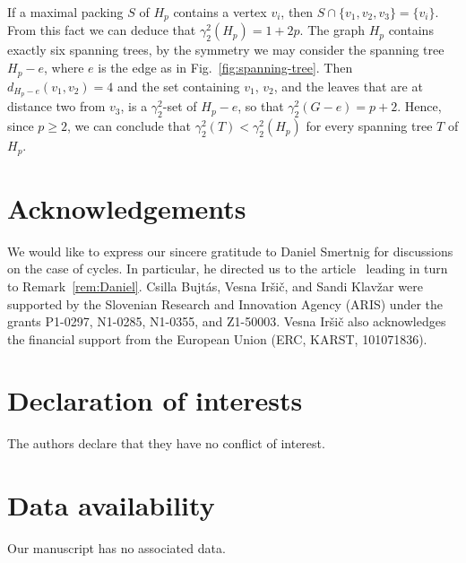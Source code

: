 \documentclass[12pt]{article}
\newcommand{\mrho}{\gamma_2^2}
\begin{document}
If a maximal packing $S$ of $H_p$ contains a vertex $v_i$, then $S\cap\{v_1, v_2, v_3 \} = \{v_i\}$. From this fact we can deduce that $\mrho(H_p) = 1 + 2p$. The graph $H_p$ contains exactly six spanning trees, by the symmetry we may consider the spanning tree $H_p-e$, where $e$ is the edge as in Fig.~\ref{fig:spanning-tree}. Then $d_{H_p-e}(v_1, v_2) = 4$ and the set containing $v_1$, $v_2$, and the leaves that are at distance two from $v_3$, is a $\mrho$-set of $H_p-e$, so that $\mrho(G-e)=p+2$. Hence, since $p\ge 2$, we can conclude that $\mrho(T) < \mrho(H_p)$ for every spanning tree $T$ of $H_p$. 

\section*{Acknowledgements}

We would like to express our sincere gratitude to Daniel Smertnig for discussions on the case of cycles. In particular, he  directed us to the article~\cite{Garcia} leading in turn to Remark~\ref{rem:Daniel}.
Csilla Bujt\'{a}s, Vesna Ir\v{s}i\v{c}, and Sandi Klav\v{z}ar were supported by the Slovenian Research and Innovation Agency (ARIS) under the grants P1-0297, N1-0285, N1-0355, and  Z1-50003.  Vesna Ir\v{s}i\v{c} also acknowledges the financial support from the European Union (ERC, KARST, 101071836).

\section*{Declaration of interests}
 
The authors declare that they have no conflict of interest. 

\section*{Data availability}
 
Our manuscript has no associated data.
\end{document}
